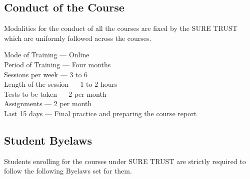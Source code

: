 \documentclass[12pt]{article}
\begin{document}
 \subsection*{Conduct of the Course}
 
Modalities for the conduct of all the courses are fixed by the SURE TRUST which are uniformly followed across the courses.\\

 \begin{flushleft}
 Mode of Training --- Online\\
 Period of Training --- Four months\\
 Sessions per week --- 3 to 6\\
 Length of the session --- 1 to 2 hours\\
 Tests to be taken --- 2 per month\\
 Assignments --- 2 per month\\
 Last 15 days --- Final practice and preparing the course report\\
 \end{flushleft}
 \subsection*{Student Byelaws}
 
Students enrolling for the courses under SURE TRUST are strictly required to follow the following Byelaws set for them.
 
\end{document}

